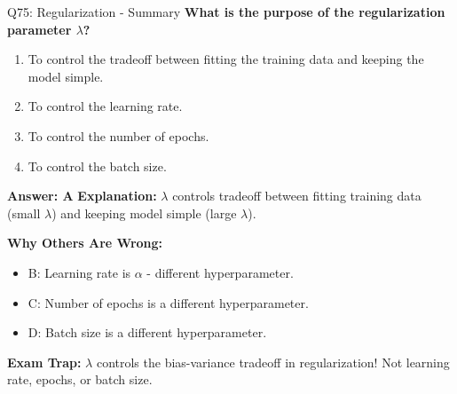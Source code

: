 \documentclass[8pt]{beamer}
\begin{document}
	\begin{frame}{Q75: Regularization - Summary}
		\fontsize{6.5}{7.5}\selectfont
		\textbf{What is the purpose of the regularization parameter $\lambda$?}
		
		\begin{enumerate}
			\item To control the tradeoff between fitting the training data and keeping the model simple.
			\item To control the learning rate.
			\item To control the number of epochs.
			\item To control the batch size.
		\end{enumerate}
		
		\vspace{0.05cm}
		\textcolor{myblue}{\textbf{Answer: A}}
		\vspace{0.05cm}
		\textcolor{myblue}{\textbf{Explanation:}} $\lambda$ controls tradeoff between fitting training data (small $\lambda$) and keeping model simple (large $\lambda$).
		
		\vspace{0.05cm}
		\textcolor{myred}{\textbf{Why Others Are Wrong:}}
		\begin{itemize}
			\item \textcolor{myred}{B:} Learning rate is $\alpha$ - different hyperparameter.
			\item \textcolor{myred}{C:} Number of epochs is a different hyperparameter.
			\item \textcolor{myred}{D:} Batch size is a different hyperparameter.
		\end{itemize}
		
		\textcolor{myred}{\textbf{Exam Trap:}} $\lambda$ controls the \textcolor{myblue}{bias-variance tradeoff} in regularization! Not learning rate, epochs, or batch size.
	\end{frame}
	
	
\end{document}
